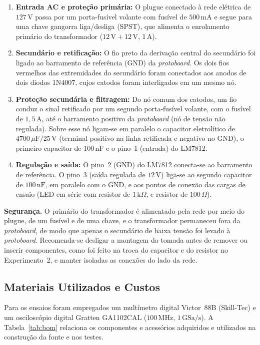 \begin{enumerate}
    \item \textbf{Entrada AC e proteção primária:} O plugue conectado à rede elétrica de $127\,\text{V}$ passa por um porta-fusível volante com fusível de $500\,\text{mA}$ e segue para uma chave gangorra liga/desliga (SPST), que alimenta o enrolamento primário do transformador ($12\,\text{V}+12\,\text{V}$, $1\,\text{A}$).
    \item \textbf{Secundário e retificação:} O fio preto da derivação central do secundário foi ligado ao barramento de referência (GND) da \textit{protoboard}. Os dois fios vermelhos das extremidades do secundário foram conectados aos anodos de dois diodos 1N4007, cujos catodos foram interligados em um mesmo nó.
    \item \textbf{Proteção secundária e filtragem:} Do nó comum dos catodos, um fio conduz o sinal retificado por um segundo porta-fusível volante, com o fusível de $1{,}5\,\text{A}$, até o barramento positivo da \textit{protoboard} (nó de tensão não regulada). Sobre esse nó ligam-se em paralelo o capacitor eletrolítico de $4700\,\mu\text{F} / 25\,\text{V}$ (terminal positivo na linha retificada e negativo no GND), o primeiro capacitor de $100\,\text{nF}$ e o pino~1 (entrada) do LM7812.
    \item \textbf{Regulação e saída:} O pino~2 (GND) do LM7812 conecta-se ao barramento de referência. O pino~3 (saída regulada de $12\,\text{V}$) liga-se ao segundo capacitor de $100\,\text{nF}$, em paralelo com o GND, e aos pontos de conexão das cargas de ensaio (LED em série com resistor de $1\,\text{k}\Omega$, e resistor de $100\,\Omega$).
\end{enumerate}

\textbf{Segurança.} O primário do transformador é alimentado pela rede por meio do plugue, de um fusível e de uma chave, e o transformador permaneceu fora da \textit{protoboard}, de modo que apenas o secundário de baixa tensão foi levado à \textit{protoboard}. Recomenda-se desligar a montagem da tomada antes de remover ou inserir componentes, como foi feito na troca do capacitor e do resistor no Experimento~2, e manter isoladas as conexões do lado da rede.

\subsection{Materiais Utilizados e Custos}

Para os ensaios foram empregados um multímetro digital Victor~88B (Skill-Tec) e um osciloscópio digital Gratten GA1102CAL ($100\,\text{MHz}$, $1\,\text{GSa/s}$). A Tabela~\ref{tab:bom} relaciona os componentes e acessórios adquiridos e utilizados na construção da fonte e nos testes.

